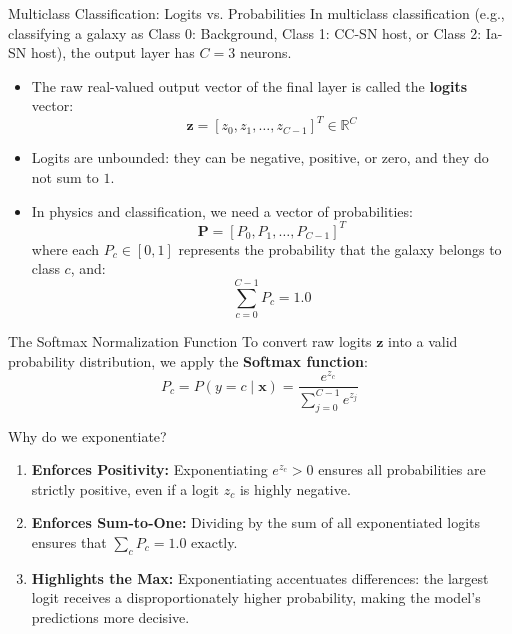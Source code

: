 \documentclass[9pt]{beamer}
\begin{document}
\begin{frame}{Multiclass Classification: Logits vs. Probabilities}
  In multiclass classification (e.g., classifying a galaxy as Class 0: Background, Class 1: CC-SN host, or Class 2: Ia-SN host), the output layer has $C=3$ neurons.
  \begin{itemize}
    \item The raw real-valued output vector of the final layer is called the \textbf{logits} vector:
      $$\mathbf{z} = [z_0, z_1, \dots, z_{C-1}]^T \in \mathbb{R}^C$$
    \item Logits are unbounded: they can be negative, positive, or zero, and they do not sum to $1$.
    \item In physics and classification, we need a vector of probabilities:
      $$\mathbf{P} = [P_0, P_1, \dots, P_{C-1}]^T$$
      where each $P_c \in [0, 1]$ represents the probability that the galaxy belongs to class $c$, and:
      $$\sum_{c=0}^{C-1} P_c = 1.0$$
  \end{itemize}
\end{frame}

\begin{frame}{The Softmax Normalization Function}
  To convert raw logits $\mathbf{z}$ into a valid probability distribution, we apply the \textbf{Softmax function}:
  $$P_c = P(y = c \mid \mathbf{x}) = \frac{e^{z_c}}{\sum_{j=0}^{C-1} e^{z_j}}$$
  \begin{block}{Why do we exponentiate?}
    \begin{enumerate}
      \item \textbf{Enforces Positivity:} Exponentiating $e^{z_c} > 0$ ensures all probabilities are strictly positive, even if a logit $z_c$ is highly negative.
      \item \textbf{Enforces Sum-to-One:} Dividing by the sum of all exponentiated logits ensures that $\sum_c P_c = 1.0$ exactly.
      \item \textbf{Highlights the Max:} Exponentiating accentuates differences: the largest logit receives a disproportionately higher probability, making the model's predictions more decisive.
    \end{enumerate}
  \end{block}
\end{frame}
\end{document}
